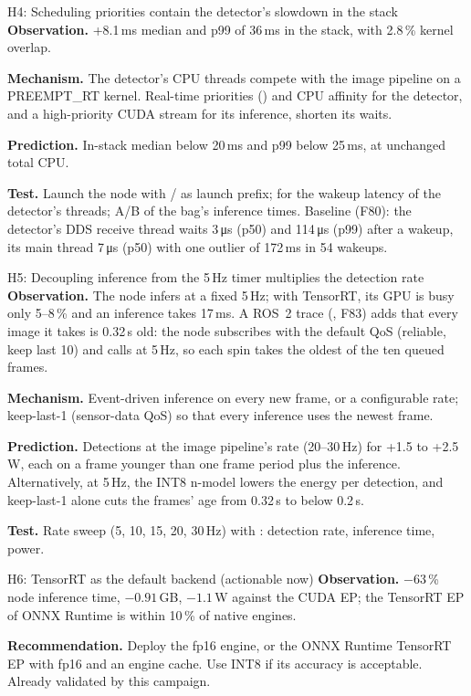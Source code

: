 \documentclass[11pt,a4paper]{article}
\newcommand{\finding}[1]{\textsf{\small F#1}}
\begin{document}
\begin{hypbox}{H4: Scheduling priorities contain the detector's slowdown in the stack}
\textbf{Observation.} +8.1\,ms median and p99 of 36\,ms in the stack, with 2.8\,\% kernel overlap.
\par\textbf{Mechanism.} The detector's CPU threads compete with the image pipeline on a PREEMPT\_RT kernel. Real-time
priorities () and CPU affinity for the detector, and a high-priority CUDA stream for its inference,
shorten its waits.
\par\textbf{Prediction.} In-stack median below 20\,ms and p99 below 25\,ms, at unchanged total CPU.
\par\textbf{Test.} Launch the node with / as launch prefix;  for the
wakeup latency of the detector's threads; A/B of the bag's inference times. Baseline (\finding{80}): the detector's
DDS receive thread waits 3\,\si{\micro\second} (p50) and 114\,\si{\micro\second} (p99) after a wakeup, its main thread
7\,\si{\micro\second} (p50) with one outlier of 172\,ms in 54 wakeups.
\end{hypbox}

\begin{hypbox}{H5: Decoupling inference from the 5\,Hz timer multiplies the detection rate}
\textbf{Observation.} The node infers at a fixed 5\,Hz; with TensorRT, its GPU is busy only 5--8\,\% and an inference
takes 17\,ms. A ROS~2 trace (, \finding{83}) adds that every image it takes is 0.32\,s old:
the node subscribes with the default QoS (reliable, keep last 10) and calls  at 5\,Hz, so each spin
takes the oldest of the ten queued frames.
\par\textbf{Mechanism.} Event-driven inference on every new frame, or a configurable rate; keep-last-1 (sensor-data QoS)
so that every inference uses the newest frame.
\par\textbf{Prediction.} Detections at the image pipeline's rate (20--30\,Hz) for +1.5 to +2.5\,W, each on a frame
younger than one frame period plus the inference. Alternatively, at 5\,Hz, the INT8 n-model lowers the energy per
detection, and keep-last-1 alone cuts the frames' age from 0.32\,s to below 0.2\,s.
\par\textbf{Test.} Rate sweep (5, 10, 15, 20, 30\,Hz) with : detection rate, inference
time, power.
\end{hypbox}

\begin{hypbox}{H6: TensorRT as the default backend (actionable now)}
\textbf{Observation.} $-63$\,\% node inference time, $-0.91$\,GB, $-1.1$\,W against the CUDA EP; the TensorRT EP of
ONNX Runtime is within 10\,\% of native engines.
\par\textbf{Recommendation.} Deploy the fp16 engine, or the ONNX Runtime TensorRT EP with fp16 and an engine cache. Use INT8
if its accuracy is acceptable. Already validated by this campaign.
\end{hypbox}
\end{document}
